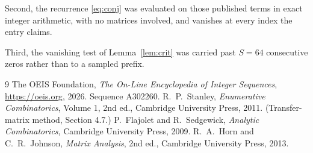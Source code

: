 \documentclass[11pt,a4paper]{article}
\theoremstyle{plain}
\theoremstyle{definition}
\begin{document}
Second, the recurrence \eqref{eq:conj} was evaluated on those published terms in exact
integer arithmetic, with no matrices involved, and vanishes at every index the entry claims.

Third, the vanishing test of Lemma~\ref{lem:crit} was carried past $S=64$ consecutive
zeros rather than to a sampled prefix.

\begin{thebibliography}{9}
 The OEIS Foundation, \emph{The On-Line Encyclopedia of Integer
Sequences}, \url{https://oeis.org}, 2026. Sequence A302260.
 R.~P.~Stanley, \emph{Enumerative Combinatorics}, Volume 1, 2nd ed.,
Cambridge University Press, 2011. (Transfer-matrix method, Section 4.7.)
 P.~Flajolet and R.~Sedgewick, \emph{Analytic Combinatorics}, Cambridge
University Press, 2009.
 R.~A.~Horn and C.~R.~Johnson, \emph{Matrix Analysis}, 2nd ed., Cambridge
University Press, 2013.
\end{thebibliography}
\end{document}
